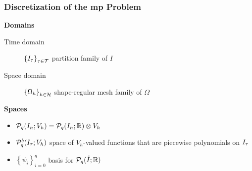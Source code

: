 \begin{frame}
    \frametitle{Discretization of the \acrshort{mp} Problem}

    \vspace*{\fill}
    \begin{multicols}{2}
        
        \begin{center}
            {\color{\accentcolor} \Large \textbf{Domains}}
            \vspace*{0.5cm}

            \begin{minipage}{0.4\textwidth}
                \begin{description}
                    \item[Time domain] $ \left\{ I_{\tau} \right\}_{\tau \in \mathcal{T}}$ partition family of $I$
                    \item[Space domain] $\left\{ \Omega_{h} \right\}_{h \in \mathcal{H}}$ shape-regular mesh family of $\Omega$
                \end{description}
            \end{minipage}
        \end{center}

        \vfill\null
        \columnbreak

        \begin{center}
            {\color{\accentcolor} \Large \textbf{Spaces}}
            \vspace*{0.5cm}

            \begin{minipage}{0.4\textwidth}
                \begin{itemize}
                    \item $\mathcal{P}_{q}(I_n; V_h) = \mathcal{P}_{q}(I_n; \mathbb{R}) \otimes V_h$
                    \item $\mathcal{P}_{q}^b(I_{\tau}; V_h)$ space of $V_h$-valued functions that are piecewise polynomials on $I_{\tau}$
                    \item $\left\{ \psi_i \right\}_{i = 0}^q$ basis for $\mathcal{P}_{q}(\hat{I}; \mathbb{R})$
                \end{itemize}
            \end{minipage}
        \end{center}

    \end{multicols}


\end{frame}
